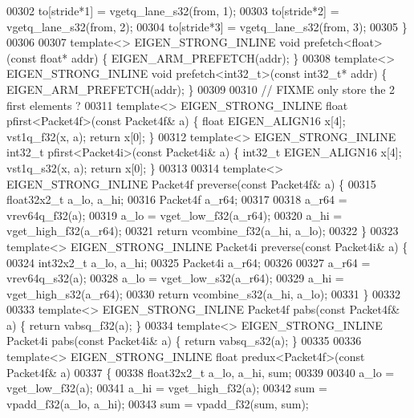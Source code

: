 \begin{DoxyCode}
{{00302   to[stride*1] = vgetq\_lane\_s32(from, 1);
00303   to[stride*2] = vgetq\_lane\_s32(from, 2);
00304   to[stride*3] = vgetq\_lane\_s32(from, 3);
00305 \}
00306 
00307 \textcolor{keyword}{template}<> EIGEN\_STRONG\_INLINE \textcolor{keywordtype}{void} prefetch<float>  (\textcolor{keyword}{const} \textcolor{keywordtype}{float}*    addr) \{ EIGEN\_ARM\_PREFETCH(addr); \}
00308 \textcolor{keyword}{template}<> EIGEN\_STRONG\_INLINE \textcolor{keywordtype}{void} prefetch<int32\_t>(\textcolor{keyword}{const} int32\_t*  addr) \{ EIGEN\_ARM\_PREFETCH(addr); \}
00309 
00310 \textcolor{comment}{// FIXME only store the 2 first elements ?}
00311 \textcolor{keyword}{template}<> EIGEN\_STRONG\_INLINE \textcolor{keywordtype}{float}   pfirst<Packet4f>(\textcolor{keyword}{const} Packet4f& a) \{ \textcolor{keywordtype}{float}   EIGEN\_ALIGN16 x[4]; 
      vst1q\_f32(x, a); \textcolor{keywordflow}{return} x[0]; \}
00312 \textcolor{keyword}{template}<> EIGEN\_STRONG\_INLINE int32\_t pfirst<Packet4i>(\textcolor{keyword}{const} Packet4i& a) \{ int32\_t EIGEN\_ALIGN16 x[4]; 
      vst1q\_s32(x, a); \textcolor{keywordflow}{return} x[0]; \}
00313 
00314 \textcolor{keyword}{template}<> EIGEN\_STRONG\_INLINE Packet4f preverse(\textcolor{keyword}{const} Packet4f& a) \{
00315   float32x2\_t a\_lo, a\_hi;
00316   Packet4f a\_r64;
00317 
00318   a\_r64 = vrev64q\_f32(a);
00319   a\_lo = vget\_low\_f32(a\_r64);
00320   a\_hi = vget\_high\_f32(a\_r64);
00321   \textcolor{keywordflow}{return} vcombine\_f32(a\_hi, a\_lo);
00322 \}
00323 \textcolor{keyword}{template}<> EIGEN\_STRONG\_INLINE Packet4i preverse(\textcolor{keyword}{const} Packet4i& a) \{
00324   int32x2\_t a\_lo, a\_hi;
00325   Packet4i a\_r64;
00326 
00327   a\_r64 = vrev64q\_s32(a);
00328   a\_lo = vget\_low\_s32(a\_r64);
00329   a\_hi = vget\_high\_s32(a\_r64);
00330   \textcolor{keywordflow}{return} vcombine\_s32(a\_hi, a\_lo);
00331 \}
00332 
00333 \textcolor{keyword}{template}<> EIGEN\_STRONG\_INLINE Packet4f pabs(\textcolor{keyword}{const} Packet4f& a) \{ \textcolor{keywordflow}{return} vabsq\_f32(a); \}
00334 \textcolor{keyword}{template}<> EIGEN\_STRONG\_INLINE Packet4i pabs(\textcolor{keyword}{const} Packet4i& a) \{ \textcolor{keywordflow}{return} vabsq\_s32(a); \}
00335 
00336 \textcolor{keyword}{template}<> EIGEN\_STRONG\_INLINE \textcolor{keywordtype}{float} predux<Packet4f>(\textcolor{keyword}{const} Packet4f& a)
00337 \{
00338   float32x2\_t a\_lo, a\_hi, sum;
00339 
00340   a\_lo = vget\_low\_f32(a);
00341   a\_hi = vget\_high\_f32(a);
00342   sum = vpadd\_f32(a\_lo, a\_hi);
00343   sum = vpadd\_f32(sum, sum);
}}
\end{DoxyCode}
